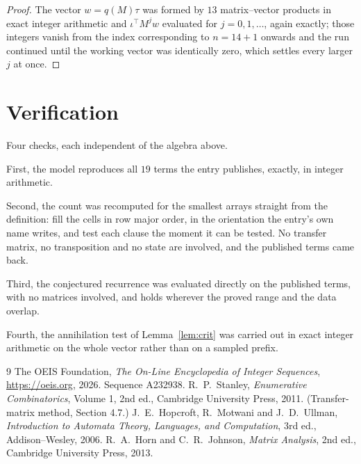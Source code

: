 \documentclass[11pt,a4paper]{article}
\theoremstyle{plain}
\theoremstyle{definition}
\begin{document}
\begin{proof}
The vector $w=q(M)\tau$ was formed by $13$ matrix--vector products in exact integer
arithmetic and $\iota^{\!\top}M^{j}w$ evaluated for $j=0,1,\dots$, again exactly; those
integers vanish from the index corresponding to $n=14+1$ onwards and the run continued
until the working vector was identically zero, which settles every larger $j$ at once.
\end{proof}

\section{Verification}

Four checks, each independent of the algebra above.

First, the model reproduces all $19$ terms the entry publishes, exactly, in integer
arithmetic.

Second, the count was recomputed for the smallest arrays straight from the definition: fill the
cells in row major order, in the orientation the entry's own name writes, and test each clause
the moment it can be tested. No transfer matrix, no transposition and no state are involved,
and the published terms came back.

Third, the conjectured recurrence was evaluated directly on the published terms, with no
matrices involved, and holds wherever the proved range and the data overlap.

Fourth, the annihilation test of Lemma~\ref{lem:crit} was carried out in exact integer
arithmetic on the whole vector rather than on a sampled prefix.

\begin{thebibliography}{9}
 The OEIS Foundation, \emph{The On-Line Encyclopedia of Integer
Sequences}, \url{https://oeis.org}, 2026. Sequence A232938.
 R.~P.~Stanley, \emph{Enumerative Combinatorics}, Volume 1, 2nd ed.,
Cambridge University Press, 2011. (Transfer-matrix method, Section 4.7.)
 J.~E.~Hopcroft, R.~Motwani and J.~D.~Ullman, \emph{Introduction to Automata
Theory, Languages, and Computation}, 3rd ed., Addison--Wesley, 2006.
 R.~A.~Horn and C.~R.~Johnson, \emph{Matrix Analysis}, 2nd ed., Cambridge
University Press, 2013.
\end{thebibliography}
\end{document}
